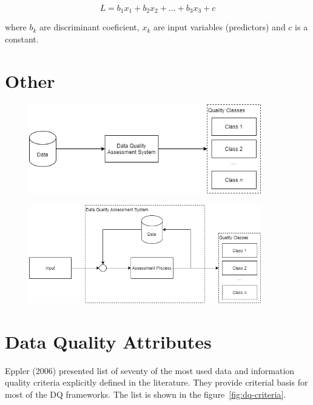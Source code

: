\begin{equation*}
    L = b_1 x_1 + b_2 x_2 + \ldots + b_3 x_3 + c
\end{equation*}

where \( b_k \) are discriminant coeficient, \( x_k \) are input variables (predictors) and \( c \) is a constant.

\newpage
\section{Other}

\begin{figure}[htb]
    \centering
    \includegraphics[width=0.9\textwidth]{figures/dq-simple.png}
    \caption{}
    \label{fig:dq-simple}
\end{figure}
\FloatBarrier

\begin{figure}[htb]
    \centering
    \includegraphics[width=0.9\textwidth]{figures/dq-system.png}
    \caption{}
    \label{fig:dq-system}
\end{figure}
\FloatBarrier

\section{Data Quality Attributes}\label{sec:data-quality-attributes}

Eppler (2006) presented list of seventy of the most used data and information quality criteria explicitly defined in the literature.
They provide criterial basis for most of the DQ frameworks.
The list is shown in the figure~\ref{fig:dq-criteria}.

